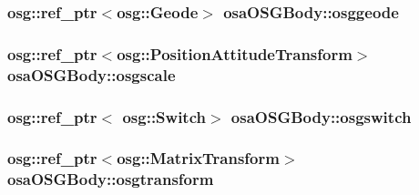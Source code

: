 \subsubsection[{osggeode}]{\setlength{\rightskip}{0pt plus 5cm}osg\+::ref\+\_\+ptr$<$osg\+::\+Geode$>$ osa\+O\+S\+G\+Body\+::osggeode\hspace{0.3cm}{\ttfamily [protected]}}\label{classosa_o_s_g_body_a581c0cb7bfb2f67fa0c95888b1421859}
\hypertarget{classosa_o_s_g_body_ac68655b29f93f536143816956b5e1c5d}{}
\subsubsection[{osgscale}]{\setlength{\rightskip}{0pt plus 5cm}osg\+::ref\+\_\+ptr$<$osg\+::\+Position\+Attitude\+Transform$>$ osa\+O\+S\+G\+Body\+::osgscale\hspace{0.3cm}{\ttfamily [protected]}}\label{classosa_o_s_g_body_ac68655b29f93f536143816956b5e1c5d}
\hypertarget{classosa_o_s_g_body_ad40360f7384568a29bdceaee80d0ca23}{}
\subsubsection[{osgswitch}]{\setlength{\rightskip}{0pt plus 5cm}osg\+::ref\+\_\+ptr$<$ osg\+::\+Switch$>$ osa\+O\+S\+G\+Body\+::osgswitch\hspace{0.3cm}{\ttfamily [protected]}}\label{classosa_o_s_g_body_ad40360f7384568a29bdceaee80d0ca23}
\hypertarget{classosa_o_s_g_body_a7077ad80a1b17557f29ddda29ed0b7ec}{}
\subsubsection[{osgtransform}]{\setlength{\rightskip}{0pt plus 5cm}osg\+::ref\+\_\+ptr$<$osg\+::\+Matrix\+Transform$>$ osa\+O\+S\+G\+Body\+::osgtransform\hspace{0.3cm}{\ttfamily [protected]}}\label{classosa_o_s_g_body_a7077ad80a1b17557f29ddda29ed0b7ec}
\hypertarget{classosa_o_s_g_body_a1fb439b90b8d0277e28240e35de006dd}{}
